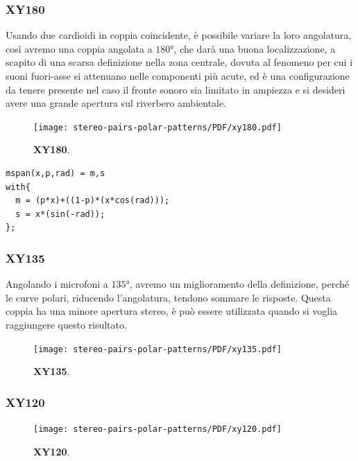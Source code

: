 \subsubsection*{XY180}
Usando due cardioidi in coppia coincidente, è possibile variare la loro
angolatura, così avremo una coppia angolata a $180°$, che darà una buona
localizzazione, a scapito di una scarsa definizione nella zona centrale,
dovuta al fenomeno per cui i suoni fuori-asse si attenuano nelle componenti più
acute, ed è una configurazione da tenere presente nel caso il fronte sonoro
sia limitato in ampiezza e si desideri avere una grande apertura sul
riverbero ambientale.
\begin{figure}[h]
\begin{center}
\texttt{[image: stereo-pairs-polar-patterns/PDF/xy180.pdf]}
\caption{\textbf{XY180}.}
\label{xy180}
\end{center}
\end{figure}
\begin{lstlisting}
mspan(x,p,rad) = m,s
with{
  m = (p*x)+((1-p)*(x*cos(rad)));
  s = x*(sin(-rad));
};
\end{lstlisting}
\subsubsection*{XY135}
Angolando i microfoni a $135°$, avremo un miglioramento
della definizione, perché le curve polari, riducendo l’angolatura, tendono
sommare le risposte. Questa coppia ha una minore apertura stereo, è può essere
utilizzata quando si voglia raggiungere questo risultato.
\begin{figure}[h]
\begin{center}
\texttt{[image: stereo-pairs-polar-patterns/PDF/xy135.pdf]}
\caption{\textbf{XY135}.}
\label{xy135}
\end{center}
\end{figure}
\subsubsection*{XY120}
\begin{figure}[h]
\begin{center}
\texttt{[image: stereo-pairs-polar-patterns/PDF/xy120.pdf]}
\caption{\textbf{XY120}.}
\label{xy120}
\end{center}
\end{figure}
